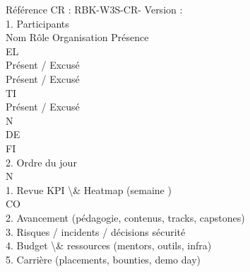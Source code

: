 \documentclass[12pt,landscape,a4paper]{article}
\begin{document}
\vspace{0.5em}
Référence CR : RBK-W3S-CR-                        Version :\\
\vspace{0.5em}
\vspace{0.5em}
\vspace{0.5em}
\vspace{0.5em}
1. Participants\\
\vspace{0.5em}
Nom                                      Rôle                       Organisation             Présence\\
\vspace{0.5em}
\vspace{0.5em}
\vspace{0.5em}
\vspace{0.5em}
EL\\
Présent / Excusé\\
Présent / Excusé\\
\vspace{0.5em}
\vspace{0.5em}
\vspace{0.5em}
\vspace{0.5em}
TI\\
Présent / Excusé\\
\vspace{0.5em}
\vspace{0.5em}
\vspace{0.5em}
\vspace{0.5em}
N\\
DE\\
FI\\
2. Ordre du jour\\
\vspace{0.5em}
\vspace{0.5em}
\vspace{0.5em}
N\\
1. Revue KPI \textbackslash{}& Heatmap (semaine                   )\\
CO\\
2. Avancement (pédagogie, contenus, tracks, capstones)\\
\vspace{0.5em}
3. Risques / incidents / décisions sécurité\\
\vspace{0.5em}
4. Budget \textbackslash{}& ressources (mentors, outils, infra)\\
\vspace{0.5em}
5. Carrière (placements, bounties, demo day)\\
\end{document}
